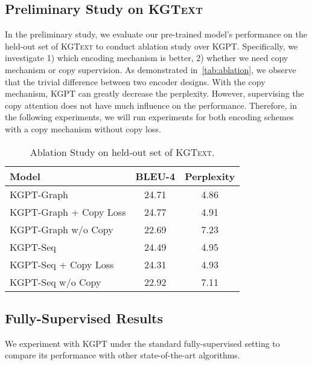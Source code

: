 \documentclass[11pt,a4paper]{article}
\newcommand{\dataset}{\textsc{KGText}\xspace}
\newcommand{\model}{KGPT\xspace}
\begin{document}
\subsection{Preliminary Study on \dataset}
In the preliminary study, we evaluate our pre-trained model's performance on the held-out set of \dataset to conduct ablation study over \model. Specifically, we investigate 1) which encoding mechanism is better, 2) whether we need copy mechanism or copy supervision. As demonstrated in~\autoref{tab:ablation}, we observe that the trivial difference between two encoder designs. With the copy mechanism, \model can greatly decrease the perplexity. However, supervising the copy attention does not have much influence on the performance. Therefore, in the following experiments, we will run experiments for both encoding schemes with a copy mechanism without copy loss. 
\begin{table}[!thb]
\centering
\small
\begin{tabular}{lcc}
\hline
Model & BLEU-4 & Perplexity \\
\hline
\model-Graph  & 24.71  &  4.86 \\
\model-Graph + Copy Loss  & 24.77  &  4.91 \\
\model-Graph w/o Copy  & 22.69  &  7.23 \\
\hline
\model-Seq    & 24.49  &  4.95 \\
\model-Seq + Copy Loss   & 24.31  &  4.93 \\
\model-Seq w/o Copy  & 22.92  & 7.11  \\
\hline
\end{tabular}
\caption{Ablation Study on held-out set of \dataset.}
\label{tab:ablation}
\end{table}

\subsection{Fully-Supervised Results}
We experiment with \model under the standard fully-supervised setting to compare its performance with other state-of-the-art algorithms.
\end{document}
